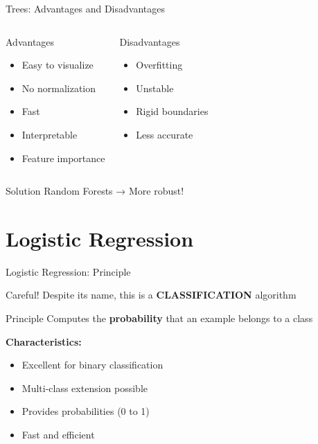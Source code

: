 \documentclass[aspectratio=169]{beamer}
\begin{document}
\begin{frame}{Trees: Advantages and Disadvantages}
\begin{columns}[T]
\begin{block}{Advantages}
\begin{itemize}
    \item Easy to visualize
    \item No normalization
    \item Fast
    \item Interpretable
    \item Feature importance
\end{itemize}
\end{block}

\begin{block}{Disadvantages}
\begin{itemize}
    \item Overfitting
    \item Unstable
    \item Rigid boundaries
    \item Less accurate
\end{itemize}
\end{block}
\end{columns}

\vspace{0.5cm}
\begin{alertblock}{Solution}
Random Forests → More robust!
\end{alertblock}
\end{frame}

\section{Logistic Regression}

\begin{frame}{Logistic Regression: Principle}
\begin{alertblock}{Careful!}
Despite its name, this is a \textbf{CLASSIFICATION} algorithm
\end{alertblock}

\vspace{0.5cm}
\begin{block}{Principle}
Computes the \textbf{probability} that an example belongs to a class
\end{block}

\vspace{0.5cm}
\textbf{Characteristics:}
\begin{itemize}
    \item Excellent for binary classification
    \item Multi-class extension possible
    \item Provides probabilities (0 to 1)
    \item Fast and efficient
\end{itemize}
\end{frame}
\end{document}
